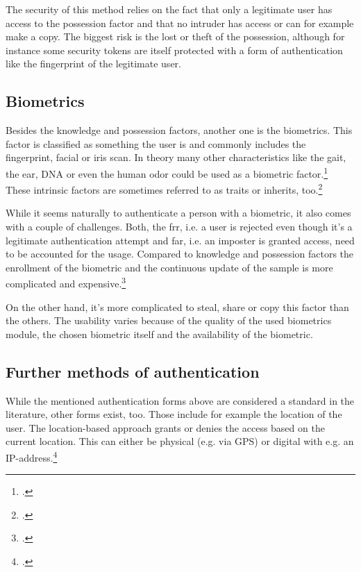 The security of this method relies on the fact that only a legitimate user has access to the possession factor and that no intruder has access or can for example make a copy. The biggest risk is the lost or theft of the possession, although for instance some security tokens are itself protected with a form of authentication like the fingerprint of the legitimate user.

\subsection{Biometrics}

Besides the knowledge and possession factors, another one is the biometrics. This factor is classified as \frqq something the user is\flqq{} and commonly includes the fingerprint, facial or iris scan. In theory many other characteristics like the gait, the ear, DNA or even the human odor could be used as a biometric factor.\footcite[See][30--34]{Jain2011}\\
These intrinsic factors are sometimes referred to as traits or inherits, too.\footcite[See][186]{dasgupta2017multi}

While it seems naturally to authenticate a person with a biometric, it also comes with a couple of challenges. Both, the \gls{frr}, i.e. a user is rejected even though it's a legitimate authentication attempt and \gls{far}, i.e. an imposter is granted access, need to be accounted for the usage. Compared to knowledge and possession factors the enrollment of the biometric and the continuous update of the sample is more complicated and expensive.\footcite[See][18--24]{Jain2011}

On the other hand, it's more complicated to steal, share or copy this factor than the others. The usability varies because of the quality of the used biometrics module, the chosen biometric itself and the availability of the biometric.

\subsection{Further methods of authentication}

While the mentioned authentication forms above are considered a standard in the literature, other forms exist, too. Those include for example the location of the user. The location-based approach grants or denies the access based on the current location. This can either be physical (e.g. via GPS) or digital with e.g. an IP-address.\footcite{6296127}

